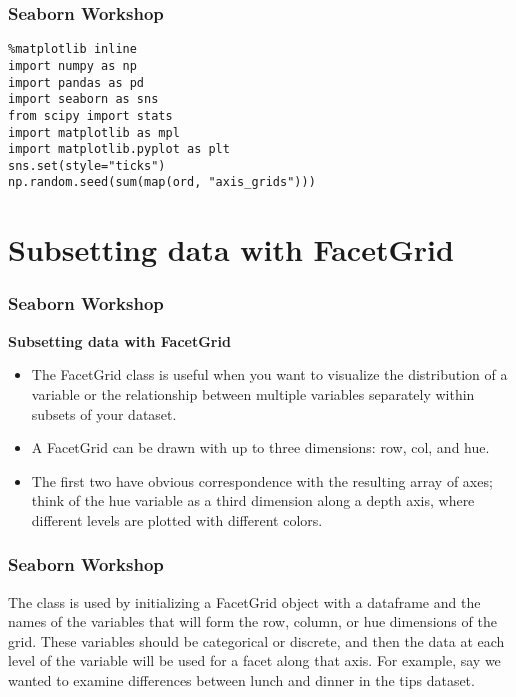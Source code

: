 \documentclass{beamer}
\begin{document}
\begin{frame}[fragile]
\frametitle{Seaborn Workshop}
\large
\begin{verbatim}
%matplotlib inline
import numpy as np
import pandas as pd
import seaborn as sns
from scipy import stats
import matplotlib as mpl
import matplotlib.pyplot as plt
sns.set(style="ticks")
np.random.seed(sum(map(ord, "axis_grids")))
\end{verbatim}

\end{frame}
\section{Subsetting data with FacetGrid}
\begin{frame}[fragile]
\frametitle{Seaborn Workshop}
\large
\noindent \textbf{Subsetting data with FacetGrid}
\begin{itemize}
\item The FacetGrid class is useful when you want to visualize the distribution of a variable or the relationship between multiple variables separately within subsets of your dataset. 
\item A FacetGrid can be drawn with up to three dimensions: row, col, and hue. 
\item The first two have obvious correspondence with the resulting array of axes; think of the hue variable as a third dimension along a depth axis, where different levels are plotted with different colors.
\end{itemize}

\end{frame}
\begin{frame}[fragile]
\frametitle{Seaborn Workshop}
\large
The class is used by initializing a FacetGrid object with a dataframe and the names of the variables that will form the row, column, or hue dimensions of the grid. These variables should be categorical or discrete, and then the data at each level of the variable will be used for a facet along that axis. For example, say we wanted to examine differences between lunch and dinner in the tips dataset.

\end{frame}
\end{document}
